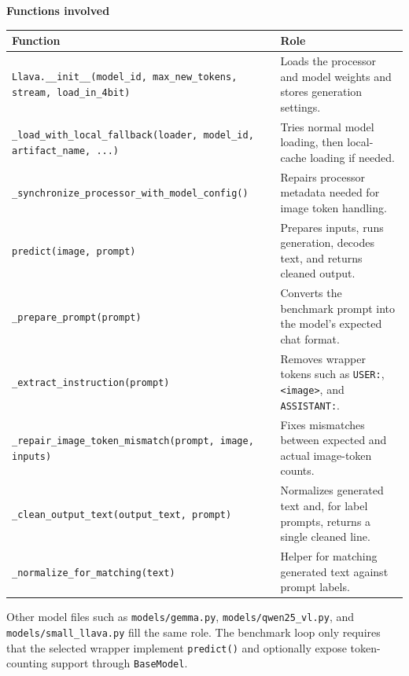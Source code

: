 \documentclass[11pt]{article}
\begin{document}
\textbf{Functions involved}
\begin{longtable}{>{\ttfamily}p{}p{}}
\textnormal{Function} & \textnormal{Role} \\
\hline
\texttt{Llava.\_\_init\_\_(model\_id, max\_new\_tokens, stream, load\_in\_4bit)} & Loads the processor and model weights and stores generation settings. \\
\texttt{\_load\_with\_local\_fallback(loader, model\_id, artifact\_name, ...)} & Tries normal model loading, then local-cache loading if needed. \\
\texttt{\_synchronize\_processor\_with\_model\_config()} & Repairs processor metadata needed for image token handling. \\
\texttt{predict(image, prompt)} & Prepares inputs, runs generation, decodes text, and returns cleaned output. \\
\texttt{\_prepare\_prompt(prompt)} & Converts the benchmark prompt into the model's expected chat format. \\
\texttt{\_extract\_instruction(prompt)} & Removes wrapper tokens such as \texttt{USER:}, \texttt{<image>}, and \texttt{ASSISTANT:}. \\
\texttt{\_repair\_image\_token\_mismatch(prompt, image, inputs)} & Fixes mismatches between expected and actual image-token counts. \\
\texttt{\_clean\_output\_text(output\_text, prompt)} & Normalizes generated text and, for label prompts, returns a single cleaned line. \\
\texttt{\_normalize\_for\_matching(text)} & Helper for matching generated text against prompt labels. \\
\end{longtable}

Other model files such as \texttt{models/gemma.py}, \texttt{models/qwen25\_vl.py}, and \texttt{models/small\_llava.py} fill the same role. The benchmark loop only requires that the selected wrapper implement \texttt{predict()} and optionally expose token-counting support through \texttt{BaseModel}.
\end{document}

